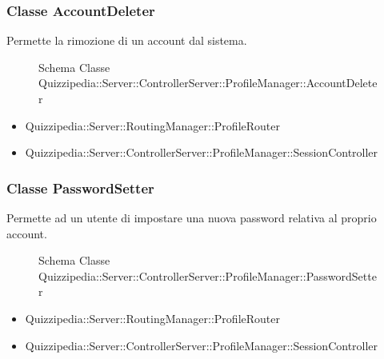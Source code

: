 \subsubsection{Classe AccountDeleter}
Permette la rimozione di un account dal sistema.
\begin{figure}[H]
\centering
\noindent{}
\caption{Schema Classe Quizzipedia::Server::ControllerServer::ProfileManager::AccountDeleter}
\end{figure}
\begin{itemize}
\item Quizzipedia::Server::RoutingManager::ProfileRouter
\end{itemize}
\begin{itemize}
\item Quizzipedia::Server::ControllerServer::ProfileManager::SessionController
\end{itemize}
\subsubsection{Classe PasswordSetter}
Permette ad un utente di impostare una nuova password relativa al proprio account.
\begin{figure}[H]
\centering
\noindent{}
\caption{Schema Classe Quizzipedia::Server::ControllerServer::ProfileManager::PasswordSetter}
\end{figure}
\begin{itemize}
\item Quizzipedia::Server::RoutingManager::ProfileRouter
\end{itemize}
\begin{itemize}
\item Quizzipedia::Server::ControllerServer::ProfileManager::SessionController
\end{itemize}
